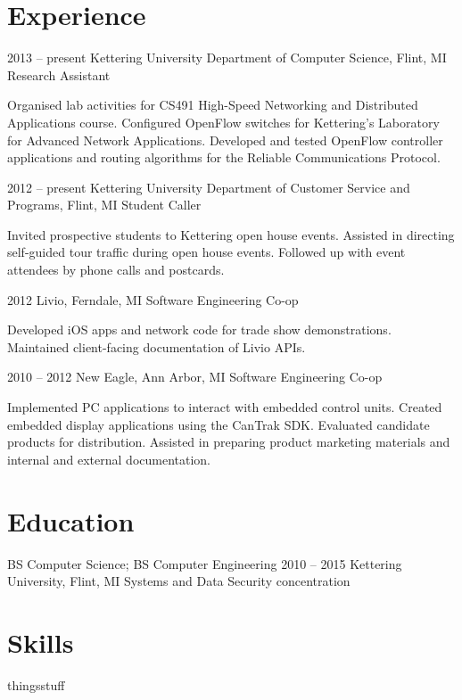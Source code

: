 \documentclass[12pt]{tccv/actccv}
\begin{document}
\address{PO Box 320426, Flint, MI 48532}

\maketitle

\section{Experience}

\begin{eventlist}
\item{2013 -- present}
     {Kettering University Department of Computer Science, Flint, MI}
     {Research Assistant}
     
     Organised lab activities for CS491 High-Speed Networking and 
     Distributed Applications course. Configured OpenFlow switches 
     for Kettering's Laboratory for Advanced Network Applications.
     Developed and tested OpenFlow controller applications and routing algorithms 
     for the Reliable Communications Protocol.

\item{2012 -- present}
     {Kettering University Department of Customer Service and Programs, Flint, MI}
     {Student Caller}
     
     Invited prospective students to Kettering open house events.
     Assisted in directing self-guided tour traffic during open house events.
     Followed up with event attendees by phone calls and postcards.
     
\item{2012}
     {Livio, Ferndale, MI}
     {Software Engineering Co-op}
     
     Developed iOS apps and network code for trade show demonstrations.
     Maintained client-facing documentation of Livio APIs.
     
\item{2010 -- 2012}
     {New Eagle, Ann Arbor, MI}
     {Software Engineering Co-op}
     
     Implemented PC applications to interact with embedded control units.
     Created embedded display applications using the CanTrak SDK.
     Evaluated candidate products for distribution.
     Assisted in preparing product marketing materials and internal and 
     external documentation.
     
\end{eventlist}

\section{Education}

\begin{yearlist}

\item[BS Computer Science; BS Computer Engineering]{2010 -- 2015}
     {Kettering University, Flint, MI}
     {Systems and Data Security concentration}

\end{yearlist}

\section{Skills}

\begin{factlist}
\item{things}{stuff}
\end{factlist}
\end{document}
